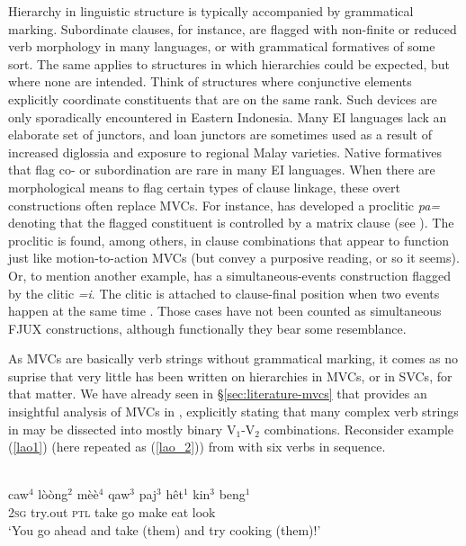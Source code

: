 Hierarchy in linguistic structure is typically accompanied by grammatical marking. Subordinate clauses, for instance, are flagged with non-finite or reduced verb morphology in many languages, or with grammatical formatives of some sort. The same applies to structures in which hierarchies could be expected, but where none are intended. Think of structures where conjunctive elements explicitly coordinate constituents that are on the same rank. Such devices are only sporadically encountered in Eastern Indonesia. Many EI languages lack an elaborate set of junctors, and  loan junctors are sometimes used as a result of increased diglossia and exposure to regional Malay varieties. Native formatives that flag co- or subordination are rare in many EI languages. When there are morphological means to flag certain types of clause linkage, these overt constructions often replace MVCs. For instance,  has developed a proclitic \textit{pa=} denoting that the flagged constituent is controlled by a matrix clause (see \citealt[338ff.]{klamer1998grammar}). The proclitic is found, among others, in clause combinations that appear to function just like motion-to-action MVCs (but convey a purposive reading, or so it seems). Or, to mention another example,  has a simultaneous-events construction flagged by the clitic \textit{=i}. The clitic is attached to clause-final position when two events happen at the same time \citep{berry1999}. Those cases have not been counted as simultaneous FJUX constructions, although functionally they bear some resemblance.

\largerpage[-1]
As MVCs are basically verb strings without grammatical marking, it comes as no suprise that very little has been written on hierarchies in MVCs, or in SVCs, for that matter. We have already seen in §\ref{sec:literature-mvcs} that \citet{enfield2008verbs} provides an insightful analysis of MVCs in , explicitly stating that many complex verb strings in  may be dissected into mostly binary V$_1$-V$_2$ combinations. Reconsider example (\ref{lao1}) (here repeated as (\ref{lao_2})) from  with six verbs in sequence.

\ea \label{lao_2}
\\
\gll caw$^4$ lòòng$^2$ mèè$^4$ qaw$^3$ paj$^3$ hêt$^1$ kin$^3$ beng$^1$ \\
2\textsc{sg} try.out \textsc{ptl} take go make eat look \\
\glft `You go ahead and take (them) and try cooking (them)!'\\ 
\z

